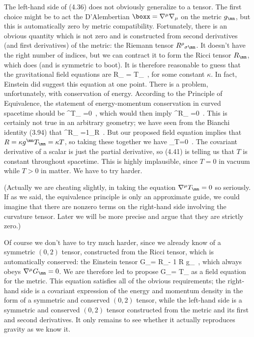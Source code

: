 \documentclass[12pt]{article}
\begin{document}
The left-hand side of (4.36) does not obviously generalize to
a tensor.  The first choice might be to act the D'Alembertian
$\boxx = \nabla^\mu \nabla_\mu$ on the metric $g_\mn$, but this
is automatically zero by metric compatibility.  Fortunately, there
is an obvious quantity which is not zero and is constructed from
second derivatives (and first derivatives) of the metric: the
Riemann tensor $R^\rho{}_{\sigma\mn}$.  It doesn't have the right
number of indices, but we can contract it to form the Ricci tensor
$R_{\mn}$, which does (and is symmetric to boot).  It is therefore
reasonable to guess that the gravitational field equations are
\be
  R_{\mn} = \kappa T_{\mn}\ ,\label{4.37}
\ee
for some constant $\kappa$.  In fact, Einstein did suggest this
equation at one point.  There is a problem, unfortunately, with
conservation of energy.  According to the Principle of Equivalence,
the statement of energy-momentum conservation in curved spacetime
should be
\be
  \nabla^\mu T_{\mn} =0\ ,\label{4.38}
\ee
which would then imply
\be
  \nabla^\mu R_{\mn} =0\ .\label{4.39}
\ee
This is certainly not true in an arbitrary geometry; we have seen
from the Bianchi identity (3.94) that
\be
  \nabla^\mu R_{\mn} ={1}\nabla_\nu R\ .\label{4.40}
\ee
But our proposed field equation implies that $R=\kappa g^{\mn}
T_{\mn} = \kappa T$, so taking these together we have
\be
  \nabla_\mu T=0\ .\label{4.41}
\ee
The covariant derivative of a scalar is just the partial derivative,
so (4.41) is telling us that $T$ is constant throughout spacetime.
This is highly implausible, since $T=0$ in vacuum while $T>0$ in
matter.  We have to try harder.

(Actually we are cheating slightly, in taking the equation
$\nabla^\mu T_{\mn} =0$ so seriously.  If as we said, the equivalence
principle is only an approximate guide, we could imagine that there are
nonzero terms on the right-hand side involving the curvature tensor.  
Later we will be more precise and argue that they are strictly zero.)

Of course we don't have to try much harder, since we already know
of a symmetric $(0,2)$ tensor, constructed from the Ricci tensor,
which is automatically conserved: the Einstein tensor
\be
  G_\mn = R_\mn - {1} R g_\mn\ ,\label{4.42}
\ee
which always obeys $\nabla^\mu G_\mn =0$.  We are therefore led to
propose
\be
  G_\mn = \kappa T_\mn\label{4.43}
\ee
as a field equation for the metric.  This equation satisfies all
of the obvious requirements; the right-hand side is a covariant
expression of the energy and momentum density in the form of a
symmetric and conserved $(0,2)$ tensor, while the left-hand side
is a symmetric and conserved $(0,2)$ tensor constructed from the metric
and its first and second derivatives.  It only remains to see whether
it actually reproduces gravity as we know it.  
\end{document}
